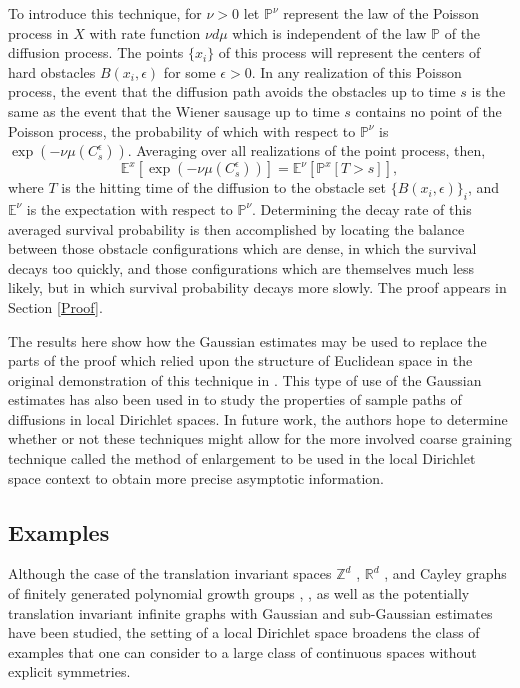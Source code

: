 \documentclass[letterpaper,oneside,english]{amsart}
\begin{document}
To introduce this technique, for $\nu>0$ let $\mathbb{P}^{\nu}$ represent the law of the Poisson process in $X$ with rate function $\nu d\mu$ which is independent of the law $\mathbb{P}$ of the diffusion process.  The points $\{x_i\}$ of this process will represent the centers of hard obstacles $B(x_i,\epsilon)$ for some $\epsilon>0$.  In any realization of this Poisson process, the event that the diffusion path avoids the obstacles up to time $s$ is the same as the event that the Wiener sausage up to time $s$ contains no point of the Poisson process, the probability of which with respect to $\mathbb{P}^{\nu}$ is $\exp(-\nu \mu(C_s^{\epsilon}))$.  Averaging over all realizations of the point process, then, 
\begin{equation}
\mathbb{E}^x\left[\exp(-\nu \mu(C_s^\epsilon)) \right]= \mathbb{E}^{\nu}\left[\mathbb{P}^x\left[T>s\right]\right],
\end{equation}
where $T$ is the hitting time of the diffusion to the obstacle set $\{ B(x_i,\epsilon) \}_i$, and $\mathbb{E}^{\nu}$ is the expectation with respect to $\mathbb{P}^{\nu}$.  Determining the decay rate of this averaged survival probability is then accomplished by locating the balance between those obstacle configurations which are dense, in which the survival decays too quickly, and those  configurations which are themselves much less likely, but in which survival probability decays more slowly.  The proof appears in Section \ref{Proof}.

The results here show how the Gaussian estimates may be used to replace the parts of the proof which relied upon the structure of Euclidean space in the original demonstration of this technique in \cite{SznBolt}.  This type of use of the Gaussian estimates has also been used in \cite{LSCBendikov} to study the properties of sample paths of diffusions in local Dirichlet spaces.  In future work, the authors hope to determine whether or not these techniques might allow for the more involved coarse graining technique called the method of enlargement \cite{SznBook} to be used in the local Dirichlet space context to obtain more precise asymptotic information.  

\subsection{Examples}\label{Examples}
Although the case of the translation invariant spaces ${\mathbb{Z}}^d$ \cite{DV}, ${\mathbb{R}}^d$ \cite{SznSausage}, and Cayley graphs of finitely generated polynomial growth groups \cite{Erschler2}, \cite{Erschler}, as well as the potentially translation invariant infinite graphs with Gaussian and sub-Gaussian estimates \cite{Gibson} have been studied, the setting of a local Dirichlet space broadens the class of examples that one can consider to a large class of continuous spaces without explicit symmetries.
\end{document}
